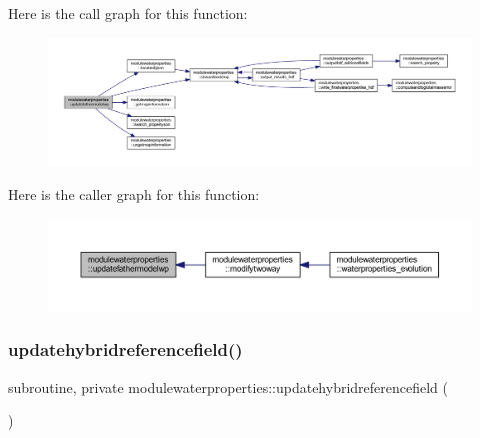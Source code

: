 Here is the call graph for this function\+:\nopagebreak
\begin{figure}[H]
\begin{center}
\leavevmode
\includegraphics[width=350pt]{namespacemodulewaterproperties_ad407a42c26969949261233d9d0aa8da1_cgraph}
\end{center}
\end{figure}
Here is the caller graph for this function\+:\nopagebreak
\begin{figure}[H]
\begin{center}
\leavevmode
\includegraphics[width=350pt]{namespacemodulewaterproperties_ad407a42c26969949261233d9d0aa8da1_icgraph}
\end{center}
\end{figure}
\mbox{\label{namespacemodulewaterproperties_a352c7f22b34ddac5b3bada0a33cd7221}} 
\subsubsection{\texorpdfstring{updatehybridreferencefield()}{updatehybridreferencefield()}}
{\footnotesize\ttfamily subroutine, private modulewaterproperties\+::updatehybridreferencefield (\begin{DoxyParamCaption}{ }\end{DoxyParamCaption})\hspace{0.3cm}{\ttfamily [private]}}

